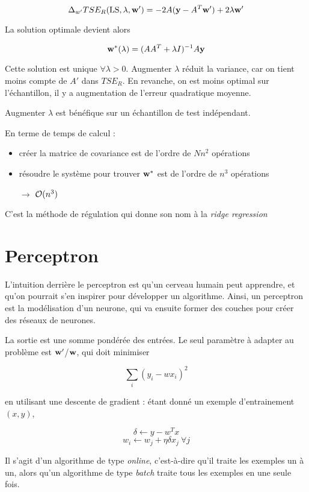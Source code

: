 	$$\Delta_{w'} TSE_R(\text{LS}, \lambda, \textbf{w}') = -2 A (\textbf{y} - A^T\textbf{w}') + 2 \lambda \textbf{w}'$$
	
	La solution optimale devient alors
	
	$$\textbf{w}^*(\lambda) = (A A^T + \lambda I)^{-1} A \textbf{y}$$
	
	Cette solution est unique $\forall \lambda > 0$. Augmenter $\lambda$ réduit la variance, car on tient moins compte de $A'$ dans $TSE_R$. En revanche, on est moins optimal sur l'échantillon, il y a augmentation de l'erreur quadratique moyenne.
		
		
	Augmenter $\lambda$ est bénéfique sur un échantillon de test indépendant.
	
	En terme de temps de calcul :
	
	\begin{itemize}
		\item créer la matrice de covariance est de l'ordre de $N n^2$ opérations
		\item résoudre le système pour trouver $\textbf{w}^*$ est de l'ordre de $n^3$ opérations
		\item[$\rightarrow$] $\mathcal{O}(n^3)$
	\end{itemize}
	
	
	C'est la méthode de régulation qui donne son nom à la \textit{ridge regression}
	
	
\section{Perceptron}
	
L'intuition derrière le perceptron est qu'un cerveau humain peut apprendre, et qu'on pourrait s'en inspirer pour développer un algorithme. Ainsi, un perceptron est la modélisation d'un neurone, qui va ensuite former des couches pour créer des réseaux de neurones.
	
	
La sortie est une somme pondérée des entrées. Le seul paramètre à adapter au problème est $\textbf{w}'$/$\textbf{w}$, qui doit minimiser
	
$$\sum_i (y_i - wx_i)^2$$

en utilisant une descente de gradient : étant donné un exemple d'entrainement $(x, y)$,

$$\delta \leftarrow y - w^Tx$$
$$w_i \leftarrow w_j + \eta \delta x_j \: \forall j$$

Il s'agit d'un algorithme de type \textit{online}, c'est-à-dire qu'il traite les exemples un à un, alors qu'un algorithme de type \textit{batch} traite tous les exemples en une seule fois.

